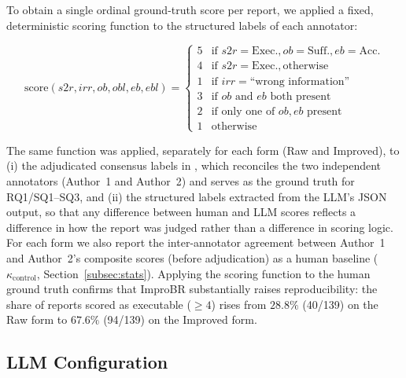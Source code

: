 To obtain a single ordinal ground-truth score per report, we applied a fixed,
deterministic scoring function to the structured labels of each annotator:

\begin{equation}
\text{score}(s2r, irr, ob, obl, eb, ebl) =
\begin{cases}
5 & \text{if } s2r=\text{Exec.}, ob=\text{Suff.}, eb=\text{Acc.}\\
4 & \text{if } s2r=\text{Exec.}, \text{otherwise}\\
1 & \text{if } irr=\text{``wrong information''}\\
3 & \text{if } ob \text{ and } eb \text{ both present}\\
2 & \text{if only one of } ob, eb \text{ present}\\
1 & \text{otherwise}
\end{cases}
\label{eq:score}
\end{equation}

The same function was applied, separately for each form (Raw and Improved), to
(i) the adjudicated consensus labels in , which
reconciles the two independent annotators (Author~1 and Author~2) and serves as
the ground truth for RQ1/SQ1--SQ3, and (ii) the structured labels extracted
from the LLM's JSON output, so that any difference between human and LLM scores
reflects a difference in how the report was judged rather than a difference in
scoring logic. For each form we also report the inter-annotator agreement
between Author~1 and Author~2's composite scores (before adjudication) as a
human baseline ($\kappa_{\text{control}}$, Section~\ref{subsec:stats}).
Applying the scoring function to the human ground truth confirms that ImproBR
substantially raises reproducibility: the share of reports scored as executable
($\geq 4$) rises from $28.8\%$ (40/139) on the Raw form to $67.6\%$ (94/139) on
the Improved form.

\subsection{LLM Configuration}
\label{subsec:llm}

